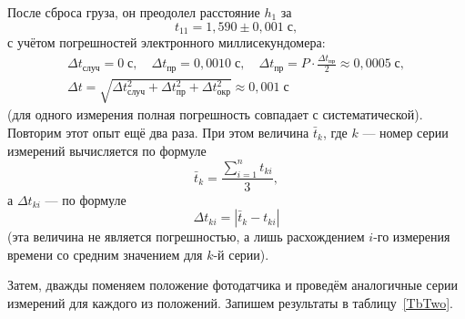 После сброса груза, он преодолел расстояние $h_1$ за
\[
t_{11}=1{,}590\pm0{,}001\;\text{с},
\]
с учётом погрешностей электронного миллисекундомера:
\begin{gather*}
\Delta t_\text{случ}=0\;\text{с},\quad\Delta t_\text{пр}=0{,}0010\;\text{с},\quad\Delta t_\text{пр}=P\cdot\frac{\Delta t_\text{пр}}{2}\approx0{,}0005\;\text{с}, \\
\Delta t=\sqrt{\Delta t_\text{случ}^2+\Delta t_\text{пр}^2+\Delta t_\text{окр}^2}\approx0{,}001\;\text{с}
\end{gather*}
(для одного измерения полная погрешность совпадает с систематической). Повторим этот опыт ещё два раза. При этом величина $\bar t_k$, где $k$ --- номер серии измерений вычисляется по формуле
\[
\bar t_k=\frac{\displaystyle\sum_{i=1}^nt_{ki}}{3},
\]
а $\Delta t_{ki}$ --- по формуле
\[
\Delta t_{ki}=\left|\bar t_k- t_{ki}\right|
\]
(эта величина не является погрешностью, а лишь расхождением $i$-го измерения времени со средним значением для $k$-й серии).

Затем, дважды поменяем положение фотодатчика и проведём аналогичные серии измерений для каждого из положений. Запишем результаты в таблицу~\ref{TbTwo}.

